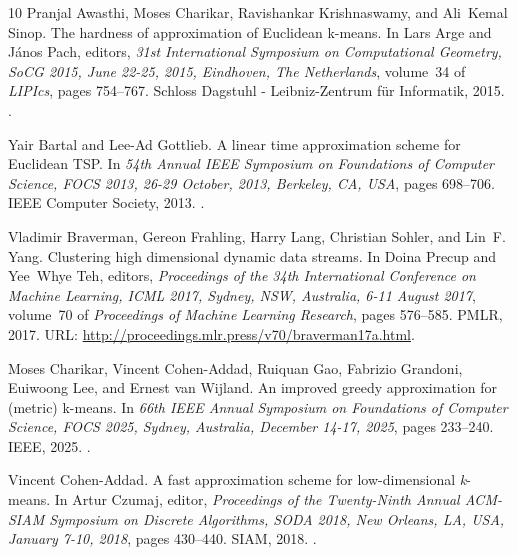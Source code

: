 \begin{thebibliography}{10}
Pranjal Awasthi, Moses Charikar, Ravishankar Krishnaswamy, and Ali~Kemal Sinop.
\newblock The hardness of approximation of {Euclidean} k-means.
\newblock In Lars Arge and J{\'{a}}nos Pach, editors, {\em 31st International
  Symposium on Computational Geometry, SoCG 2015, June 22-25, 2015, Eindhoven,
  The Netherlands}, volume~34 of {\em LIPIcs}, pages 754--767. Schloss Dagstuhl
  - Leibniz-Zentrum f{\"{u}}r Informatik, 2015.
\newblock \href {https://doi.org/10.4230/LIPIcs.SOCG.2015.754}
  {}.

Yair Bartal and Lee{-}Ad Gottlieb.
\newblock A linear time approximation scheme for {Euclidean} {TSP}.
\newblock In {\em 54th Annual {IEEE} Symposium on Foundations of Computer
  Science, {FOCS} 2013, 26-29 October, 2013, Berkeley, CA, {USA}}, pages
  698--706. {IEEE} Computer Society, 2013.
\newblock \href {https://doi.org/10.1109/FOCS.2013.80}
  {}.

Vladimir Braverman, Gereon Frahling, Harry Lang, Christian Sohler, and Lin~F.
  Yang.
\newblock Clustering high dimensional dynamic data streams.
\newblock In Doina Precup and Yee~Whye Teh, editors, {\em Proceedings of the
  34th International Conference on Machine Learning, {ICML} 2017, Sydney, NSW,
  Australia, 6-11 August 2017}, volume~70 of {\em Proceedings of Machine
  Learning Research}, pages 576--585. {PMLR}, 2017.
\newblock URL: \url{http://proceedings.mlr.press/v70/braverman17a.html}.

Moses Charikar, Vincent Cohen{-}Addad, Ruiquan Gao, Fabrizio Grandoni, Euiwoong
  Lee, and Ernest van Wijland.
\newblock An improved greedy approximation for (metric) k-means.
\newblock In {\em 66th {IEEE} Annual Symposium on Foundations of Computer
  Science, {FOCS} 2025, Sydney, Australia, December 14-17, 2025}, pages
  233--240. {IEEE}, 2025.
\newblock \href {https://doi.org/10.1109/FOCS63196.2025.00016}
  {}.

Vincent Cohen{-}Addad.
\newblock A fast approximation scheme for low-dimensional \emph{k}-means.
\newblock In Artur Czumaj, editor, {\em Proceedings of the Twenty-Ninth Annual
  {ACM-SIAM} Symposium on Discrete Algorithms, {SODA} 2018, New Orleans, LA,
  USA, January 7-10, 2018}, pages 430--440. {SIAM}, 2018.
\newblock \href {https://doi.org/10.1137/1.9781611975031.29}
  {}.


\end{thebibliography}
